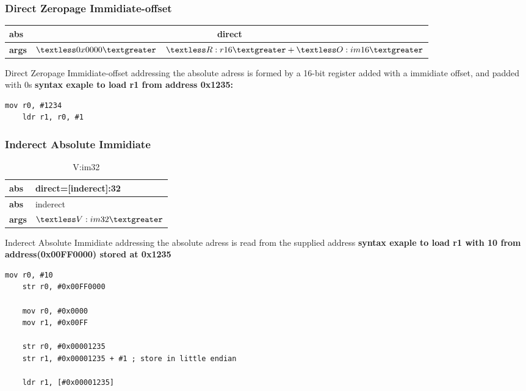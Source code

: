 \documentclass{article}
\begin{document}
	\subsubsection*{Direct Zeropage Immidiate-offset}
	\begin{table}[H]
		\centering
		\begin{tabular}{|p{2cm}|p{2cm}|p{2cm}|}
		\hline
		\textbf{abs} & \multicolumn{2}{|c|}{direct} \\
		\hline
		\textbf{args} & \(\textless 0x0000 \textgreater\) & \(\textless R:r16 \textgreater + \textless O:im16 \textgreater\) \\
		\hline
		\end{tabular}
	\end{table}
	Direct Zeropage Immidiate-offset addressing the absolute adress is
	formed by a 16-bit register added with a immidiate offset, and padded with 0s
	\newline
	\textbf{syntax exaple to load r1 from address 0x1235:}
	\newline
	\begin{needspace}{\baselineskip}
	\begin{lstlisting}[language=ASM, label={lst:armcode}]
	mov r0, #1234
	ldr r1, r0, #1
	\end{lstlisting}
	\end{needspace}

	\subsubsection*{Inderect Absolute Immidiate}
	\begin{table}[H]
		\centering
		\begin{tabular}{|p{2cm}|p{4cm}|}
		\hline
		\textbf{abs} & direct=[inderect]:32 \\
		\hline
		\textbf{abs} & inderect \\
		\hline
		\textbf{args} & \(\textless V :im32\textgreater\) \\
		\hline
		\end{tabular}
		\caption{V:im32}
		\label{tab:dir-zp-imof}
	\end{table}
	Inderect Absolute Immidiate addressing the absolute adress is
	read from the supplied address
	\newline
	\textbf{syntax exaple to load r1 with 10 from address(0x00FF0000) stored at 0x1235}
	\newline
	\begin{needspace}{\baselineskip}
	\begin{lstlisting}[language=ASM, label={lst:armcode}]
	mov r0, #10
	str r0, #0x00FF0000

	mov r0, #0x0000
	mov r1, #0x00FF

	str r0, #0x00001235
	str r1, #0x00001235 + #1 ; store in little endian

	ldr r1, [#0x00001235]
	\end{lstlisting}
	\end{needspace}
\end{document}
